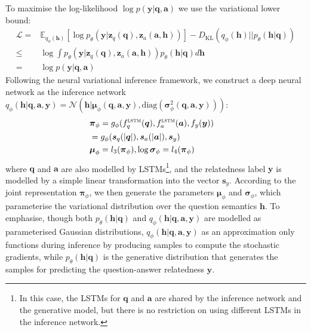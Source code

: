 \documentclass{article}
\newcommand{\nobracket}{}
\newcommand{\tmmathbf}[1]{\ensuremath{\boldsymbol{#1}}}
\newcommand{\tmop}[1]{\ensuremath{\operatorname{#1}}}
\begin{document}
To maximise the log-likelihood $\log p (\tmmathbf{y}| \tmmathbf{q}, \tmmathbf{a})$ we use the variational lower bound:
\begin{align}
  \nonumber \mathcal{L}\!\! = & \mathbb{E}_{q_{\phi}\! ( \tmmathbf{h})}\! [\log p_{\theta}
  (\tmmathbf{y}| \tmmathbf{z}_q\! ( \tmmathbf{q}), \tmmathbf{z}_a \!(
  \tmmathbf{a}, \tmmathbf{h}) \nobracket)] \!\! -\!\! D_{\tmop{KL}}\!  (q_{\phi}\! ( \tmmathbf{h} \nobracket) ||p_{\theta}\! ( \tmmathbf{h} | \tmmathbf{q})) \\
  \nonumber \leqslant & \log
  \int p_{\theta} (\tmmathbf{y}| \tmmathbf{z}_q (
  \tmmathbf{q}), \tmmathbf{z}_a ( \tmmathbf{a}, \tmmathbf{h})) p_{\theta} (
  \tmmathbf{h} | \tmmathbf{q}) d\tmmathbf{h}\\
  = & \log p (\tmmathbf{y}| \tmmathbf{q}, \tmmathbf{a}) \label{eq:lb_nasm}
\end{align}
Following the neural variational inference framework, we construct a deep neural network as the inference network $q_{\phi} ( \tmmathbf{h} | \tmmathbf{q}, \tmmathbf{a}, \tmmathbf{y})=\mathcal{N}(\tmmathbf{h}|\tmmathbf{\mu}_\phi(\tmmathbf{q},\tmmathbf{a},\tmmathbf{y}),  \mathrm{diag} ( \tmmathbf{\sigma}^2_\phi ( \tmmathbf{q},\tmmathbf{a},\tmmathbf{y})))$:
\begin{eqnarray}
   \nonumber &\tmmathbf{\pi}_\phi  =  g_\phi ( f^\textsc{lstm}_q(\tmmathbf{q}), f^\textsc{lstm}_a(\tmmathbf{a}),f_y(\tmmathbf{y})) &\\
   &= g_\phi(\tmmathbf{s}_q (| \tmmathbf{q} |),\tmmathbf{s}_a (| \tmmathbf{a} |),\tmmathbf{s}_y) \quad \  & \label{eq:jointMLP} \\
  &\tmmathbf{\mu}_\phi  =  l_3 ( \tmmathbf{\pi}_\phi) ,
  \log \tmmathbf{\sigma}_\phi  =  l_4 ( \tmmathbf{\pi}_\phi)&
\end{eqnarray}
where $\tmmathbf{q}$ and $\tmmathbf{a}$ are also modelled by LSTMs\footnote{In this case, the LSTMs for $\tmmathbf{q}$ and $\tmmathbf{a}$ are shared by the inference network and the generative model, but there is no restriction on using different LSTMs in the inference network.}, and the relatedness label $\tmmathbf{y}$ is modelled by a simple linear transformation into the vector $\tmmathbf{s}_y$. 
According to the joint representation $\tmmathbf{\pi}_\phi$, we then generate the parameters $\tmmathbf{\mu}_\phi$ and $\tmmathbf{\sigma}_\phi$, which parameterise the variational distribution over the question semantics $\tmmathbf{h}$. 
To emphasise, though both $p_{\theta}(\tmmathbf{h} |\tmmathbf{q})$ and $q_{\phi}(\tmmathbf{h} |\tmmathbf{q},\tmmathbf{a},\tmmathbf{y})$ are modelled as parameterised Gaussian distributions, $q_{\phi}(\tmmathbf{h} |\tmmathbf{q},\tmmathbf{a},\tmmathbf{y})$ as an approximation only functions during inference by producing samples to compute the stochastic gradients, while $p_{\theta}(\tmmathbf{h} |\tmmathbf{q})$ is the generative distribution that generates the samples for predicting the question-answer relatedness $\tmmathbf{y}$.
\end{document}
